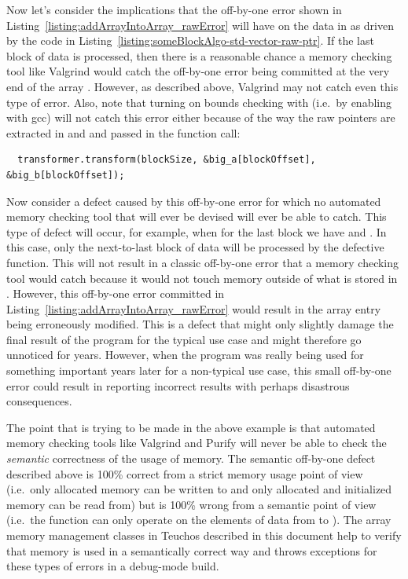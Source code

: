 \documentclass[pdf,ps2pdf,11pt]{SANDreport}
\begin{document}
Now let's consider the implications that the off-by-one error shown in
Listing~\ref{listing:addArrayIntoArray_rawError} will have on the data
in {} as driven by the code in
Listing~\ref{listing:someBlockAlgo-std-vector-raw-ptr}.  If the last
block {} of data is processed, then there is
a reasonable chance a memory checking tool like Valgrind would catch
the off-by-one error being committed at the very end of the array
{}.  However, as described above, Valgrind may not catch
even this type of error.  Also, note that turning on bounds checking
with {} (i.e.\ by enabling {}
with gcc) will not catch this error either because of the way the raw
pointers are extracted in and and passed in the function call:

{\small\begin{verbatim}
  transformer.transform(blockSize, &big_a[blockOffset], &big_b[blockOffset]);
\end{verbatim}}

Now consider a defect caused by this off-by-one error for which no
automated memory checking tool that will ever be devised will ever be
able to catch.  This type of defect will occur, for example, when for
the last block {} we have
{} and
{}.  In this case, only
the next-to-last block of data will be processed by the defective
{} function.  This will not result in a classic
off-by-one error that a memory checking tool would catch because it
would not touch memory outside of what is stored in {}.
However, this off-by-one error committed in
Listing~\ref{listing:addArrayIntoArray_rawError} would result in the
array entry {} being
erroneously modified.  This is a defect that might only slightly
damage the final result of the program for the typical use case and
might therefore go unnoticed for years.  However, when the program was
really being used for something important years later for a
non-typical use case, this small off-by-one error could result in
reporting incorrect results with perhaps disastrous consequences.

The point that is trying to be made in the above example is that
automated memory checking tools like Valgrind and Purify will never be
able to check the {}\textit{semantic} correctness of the usage of
memory.  The semantic off-by-one defect described above is 100\%
correct from a strict memory usage point of view (i.e.\ only allocated
memory can be written to and only allocated and initialized memory can
be read from) but is 100\% wrong from a semantic point of view (i.e.\
the function {} can only operate on the elements
of data from {}\ttt{0} to {}\ttt{n-1}).  The array memory management
classes in Teuchos described in this document help to verify that
memory is used in a semantically correct way and throws exceptions for
these types of errors in a debug-mode build.
\end{document}
